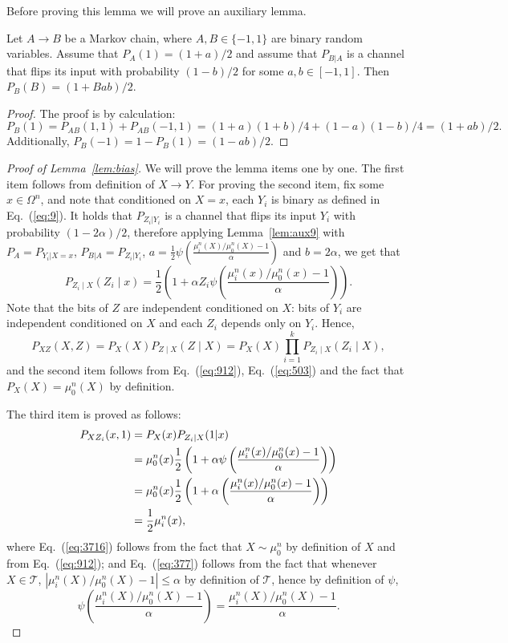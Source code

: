 \documentclass[final, 12pt]{colt2018}
\renewcommand{\eqref}[1]{Eq.~(\ref{#1})}
\begin{document}
Before proving this lemma we will prove an auxiliary lemma.
\begin{lemma} \label{lem:aux9}
Let $A \to B$ be a Markov chain, where $A,B \in \{-1,1\}$ are binary random variables. Assume that $P_A(1) = (1 + a)/2$ and assume that $P_{B | A}$ is a channel that flips its input with probability $(1-b)/2$ for some $a,b \in [-1,1]$. Then $P_B(B) = (1+B a b)/2$.
\end{lemma}

\begin{proof}
The proof is by calculation:
\[
P_B(1) 
= P_{AB}(1,1) + P_{AB}(-1,1)
= (1+a)(1+b)/4 + (1-a)(1-b)/4
= (1+ab)/2.
\]
Additionally, $P_B(-1) = 1 - P_B(1) = (1-ab)/2$.
\end{proof}

\begin{proof}[Proof of Lemma~\ref{lem:bias}]

We will prove the lemma items one by one. The first item follows from definition of $X \to Y$.
For proving the second item, fix some $x \in \Omega^n$, and note that conditioned on $X=x$, each $Y_i$ is binary as defined in \eqref{eq:9}. It holds that $P_{Z_i | Y_i}$ is a channel that flips its input $Y_i$ with probability $(1-2\alpha)/2$, therefore applying Lemma~\ref{lem:aux9} with $P_A = P_{Y_i|X=x}$, $P_{B|A}=P_{Z_i|Y_i}$, $a = \frac{1}{2} \psi\left(\frac{\mu^n_i(X) / \mu^n_0(X) - 1}{\alpha}\right)$ and $b=2\alpha$, we get that
\begin{equation} \label{eq:912}
P_{Z_i \mid X}(Z_i \mid x)
= \frac{1}{2}\left( 1 + \alpha Z_i \psi\left(\frac{\mu_i^n(x) / \mu_0^n(x) - 1}{\alpha}\right) \right).
\end{equation}
Note that the bits of $Z$ are independent conditioned on $X$: bits of $Y_i$ are independent conditioned on $X$ and each $Z_i$ depends only on $Y_i$. 
Hence,
\begin{equation}\label{eq:503}
P_{XZ}(X,Z)
= P_X(X) P_{Z\mid X}(Z \mid X)
= P_X(X) \prod_{i=1}^k P_{Z_i\mid X}(Z_i \mid X),
\end{equation}
and the second item follows from \eqref{eq:912}, \eqref{eq:503} and the fact that $P_X(X) = \mu_0^n(X)$ by definition.

The third item is proved as follows:
\begin{align}
P_{XZ_i}(x,1)   
&= P_X(x) P_{Z_i|X} (1|x) \notag\\
&= \mu_0^n(x) \frac{1}{2} \left( 1 + \alpha \psi\left(\frac{\mu_i^n(x) / \mu_0^n(x) - 1}{\alpha}\right) \right) \label{eq:3716} \\
&= \mu_0^n(x) \frac{1}{2}\left( 1 + \alpha \left(\frac{\mu_i^n(x) / \mu_0^n(x) - 1}{\alpha}\right) \right)\label{eq:377}\\
&= \frac{1}{2} \mu_i^n(x), \notag
\end{align}
where \eqref{eq:3716} follows from the fact that $X \sim \mu_0^n$ by definition of $X$ and from \eqref{eq:912}; and \eqref{eq:377} follows from the fact that whenever $X \in \mathcal{T}$, $ \left\lvert \mu_i^n(X)/\mu_0^n(X) - 1 \right\rvert \le \alpha$ by definition of $\mathcal{T}$, hence by definition of $\psi$,
\[\psi\left( \frac{\mu^n_i(X) / \mu^n_0(X) - 1}{\alpha} \right) = \frac{\mu^n_i(X) / \mu^n_0(X) - 1}{\alpha}.\]


\end{proof}
\end{document}
